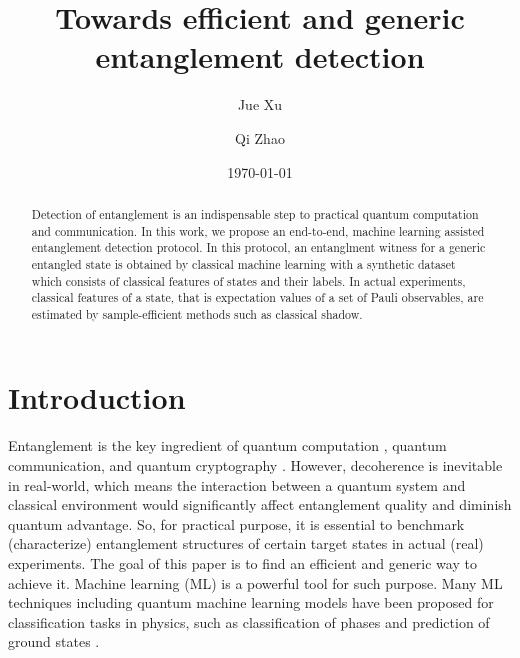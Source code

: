 \documentclass[
aps,
pra,
twocolumn,
floatfix,
]{revtex4-2}
\theoremstyle{plain}
\theoremstyle{definition}
\begin{document}
\title{Towards efficient and generic entanglement detection}
\author{Jue Xu}
\author{Qi Zhao}
\date{\today}
\begin{abstract}
	Detection of entanglement is an indispensable step to practical quantum computation and communication.
	In this work, we propose an end-to-end, machine learning assisted entanglement detection protocol.
	In this protocol, an entanglment witness for a generic entangled state is obtained by classical machine learning with a synthetic dataset which consists of classical features of states and their labels. 
	In actual experiments, classical features of a state, that is expectation values of a set of  Pauli observables, are estimated by sample-efficient methods such as classical shadow.
\end{abstract}

\maketitle

\section{Introduction}
Entanglement \cite{horodeckiQuantumEntanglement2009} is the key ingredient of quantum computation \cite{briegelMeasurementbasedQuantumComputation2009}, quantum communication, and quantum cryptography \cite{xuSecureQuantumKey2020}.
However, decoherence is inevitable in real-world, which means the interaction between a quantum system and classical environment would significantly affect entanglement quality and diminish quantum advantage. 
So, for practical purpose, it is essential to benchmark (characterize) entanglement structures of certain target states in actual (real) experiments.
The goal of this paper is to find an efficient and generic way to achieve it. 
Machine learning (ML) is a powerful tool for such purpose. 
Many ML techniques including quantum machine learning models \cite{congQuantumConvolutionalNeural2019} have been proposed for classification tasks in physics, such as classification of phases and prediction of ground states \cite{carrasquillaMachineLearningPhases2017} \cite{huangProvablyEfficientMachine2022}.
\end{document}
